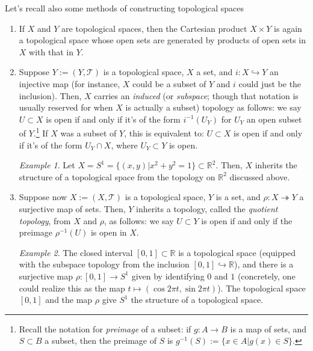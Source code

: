 \documentclass[11pt]{article}
\def\R{{\mathbb R}}
\theoremstyle{remark}
\newtheorem{ex}{Example}
\def\T{\mathcal{T}}
\begin{document}
Let's recall also some methods of constructing topological spaces
\begin{enumerate}

    \item If $X$ and $Y$ are topological spaces, then the Cartesian product $X \times Y$ is again a topological space whose open sets are generated by products of open sets in $X$ with that in $Y$.

    \item Suppose $Y:=(Y,\T)$ is a topological space, $X$ a set, and $i: X
        \hookrightarrow Y$ an injective map (for instance, $X$ could be a
        subset of $Y$ and $i$ could just be the inclusion). Then, $X$ carries
        an {\em induced} (or  {\em subspace}; though that notation is usually
        reserved for when $X$ is actually a subset) topology as follows: we say
        $U \subset X$ is open if and only if it's of the form $i^{-1}(U_Y)$ for
        $U_Y$ an open subset of $Y$.\footnote{Recall the notation for {\em preimage} of a subset: if $g: A \rightarrow B$ is a map of sets, and $S \subset B$ a subset, then the preimage of $S$ is $g^{-1}(S):= \{x \in A | g(x) \in S\}$.} If $X$ was a subset of $Y$, this is
        equivalent to: $U \subset X$ is open if and only if it's of the form
        $U_Y \cap X$, where $U_Y \subset Y$ is open.

        \begin{ex}\label{s1topology1} Let $X = S^1 = \{(x,y) | x^2 + y^2 = 1\} \subset \R^2$.
            Then, $X$ inherits the structure of a topological space from the
            topology on $\R^2$ discussed above.
        \end{ex}

    \item Suppose now $X:=(X,\T)$ is a topological space, $Y$ is a set, and $\rho: X \twoheadrightarrow Y$ a surjective map of sets. Then, $Y$ inherits a topology, called the {\em quotient topology}, from $X$ and $\rho$, as follows: we say $U \subset Y$ is open if and only if the preimage $\rho^{-1}(U)$ is open in $X$.
        \begin{ex} \label{s1topology2}
            The closed interval $[0,1] \subset \R$ is a topological space
            (equipped with the subspace topology from the inclusion $[0,1]
            \hookrightarrow \R$), and there is a surjective map $\rho: [0,1]
            \rightarrow S^1$ given by identifying $0$ and $1$ (concretely, one
            could realize this as the map $t \mapsto (\cos 2\pi t, \sin 2 \pi
            t)$). The topological space $[0,1]$ and the map $\rho$ give $S^1$
            the structure of a topological space. 
        \end{ex}


\end{enumerate}
\end{document}
